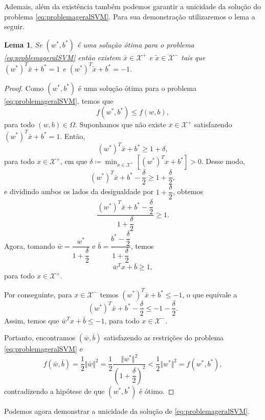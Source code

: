 \documentclass[12pt,a4paper]{scrartcl}
\def\Xset{\mathcal{X}}
\def\xbar{\bar{x}}
\newtheorem{lema}{Lema}
\theoremstyle{definition}%
\begin{document}
Ademais, além da existência também podemos garantir a unicidade da solução do problema \eqref{eq:problemageralSVM}. Para sua demonstração utilizaremos o lema a seguir.

\begin{lema} \label{lema:solucao_otima_SVM_margens}
Se $(w^{*}, b^{*})$ é uma solução ótima para o problema \eqref{eq:problemageralSVM} então existem $\xbar \in \Xset^{+}$ e $\tilde{x} \in \Xset^{-}$ tais que $(w^{*})^{T}\xbar + b^{*} = 1$ e $(w^{*})^{T}\tilde{x} + b^{*} = -1$.
\end{lema}
\begin{proof}
Como $(w^{*}, b^{*})$ é uma solução ótima para o problema \eqref{eq:problemageralSVM}, temos que
\[
f(w^{*}, b^{*}) \leq f(w, b),
\]
para todo $(w, b) \in \Omega$. Suponhamos que não existe $\xbar \in \Xset^{+}$ satisfazendo $(w^{*})^{T}\xbar + b^{*} = 1$. Então, 
\[
(w^{*})^{T}\xbar + b^{*} \geq 1 + \delta ,
\]
para todo $x \in \Xset^{+}$, em que $\delta \coloneqq \min_{x \in \Xset^{+}} [(w^{*})^{T}x + b^{*}] > 0$. Desse modo, 
\[
(w^{*})^{T}\xbar + b^{*} -\dfrac{\delta}{2} \geq 1 + \dfrac{\delta}{2},
\]
e dividindo ambos os lados da desigualdade por $1+\dfrac{\delta}{2}$, obtemos
\[
\dfrac{(w^{*})^{T}\xbar + b^{*} -\dfrac{\delta}{2}}{1 + \dfrac{\delta}{2}} \geq 1.
\]
Agora, tomando $\bar{w} = \dfrac{w^{*}}{1 + \dfrac{\delta}{2}}$ e $\bar{b} = \dfrac{b^{*} - \dfrac{\delta}{2}}{1 + \dfrac{\delta}{2}}$, temos
\[
\bar{w}^{T}x + \bar{b} \geq 1,
\]
para todo $x \in \Xset^{+}$.

Por conseguinte, para $x \in \Xset^{-}$ temos $(w^{*})^{T}\xbar + b^{*} \leq -1$, o que equivale a 
\[
(w^{*})^{T}\xbar + b^{*} -\dfrac{\delta}{2} \leq -1 - \dfrac{\delta}{2}.
\]
Assim, temos que $\bar{w}^{T}x + \bar{b} \leq -1$, para todo $x \in \Xset^{-}$.

Portanto, encontramos $(\bar{w}, \bar{b})$ satisfazendo as restrições do problema \eqref{eq:problemageralSVM} e 
\[
f(\bar{w}, \bar{b}) = \dfrac{1}{2}\Vert \bar{w} \Vert^{2} = \dfrac{1}{2} \dfrac{\Vert w^{*} \Vert^{2}}{\left( 1 + \dfrac{\delta}{2}\right)^{2}} < \dfrac{1}{2}\Vert w^{*} \Vert^{2} = f(w^{*}, b^{*}),
\]
contradizendo a hipótese de que $(w^{*}, b^{*})$ é ótimo.
\end{proof}

Podemos agora demonstrar a unicidade da solução de \eqref{eq:problemageralSVM}.
\end{document}
